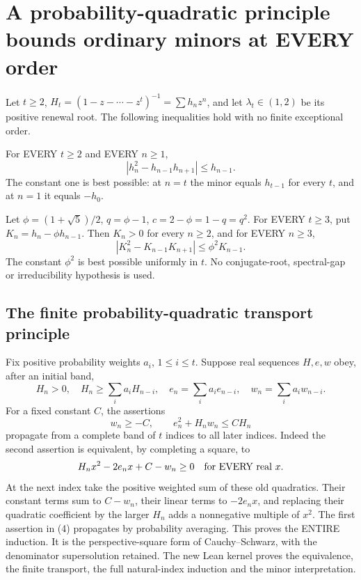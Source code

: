 \section{A probability-quadratic principle bounds ordinary minors at EVERY order}
Let $t\ge2$, $H_t=(1-z-\cdots-z^t)^{-1}=\sum h_nz^n$,
and let $\lambda_t\in(1,2)$ be its positive renewal root.
The following inequalities hold with no finite exceptional order.

\begin{theorem}
For EVERY $t\ge2$ and EVERY $n\ge1$,
\[
                  |h_n^2-h_{n-1}h_{n+1}|\le h_{n-1}.       \tag{1}
\]
The constant one is best possible: at $n=t$ the minor equals
$h_{t-1}$ for every $t$, and at $n=1$ it equals $-h_0$.
\end{theorem}

\begin{theorem}
Let $\phi=(1+\sqrt5)/2$, $q=\phi-1$, $c=2-\phi=1-q=q^2$.
For EVERY $t\ge3$, put $K_n=h_n-\phi h_{n-1}$.
Then $K_n>0$ for every $n\ge2$, and for EVERY $n\ge3$,
\[
             |K_n^2-K_{n-1}K_{n+1}|\le\phi^2K_{n-1}.       \tag{2}
\]
The constant $\phi^2$ is best possible uniformly in $t$.
No conjugate-root, spectral-gap or irreducibility hypothesis is used.
\end{theorem}

\subsection{The finite probability-quadratic transport principle}
Fix positive probability weights $a_i$, $1\le i\le t$.
Suppose real sequences $H,e,w$ obey, after an initial band,
\[
 H_n>0,\quad H_n\ge\sum_i a_iH_{n-i},\quad
 e_n=\sum_i a_ie_{n-i},\quad w_n=\sum_i a_iw_{n-i}.       \tag{3}
\]
For a fixed constant $C$, the assertions
\[
      w_n\ge-C,\qquad e_n^2+H_nw_n\le CH_n              \tag{4}
\]
propagate from a complete band of $t$ indices to all later indices.
Indeed the second assertion is equivalent, by completing a square, to
\[
                H_nx^2-2e_nx+C-w_n\ge0\quad\hbox{for EVERY real }x.
\]
At the next index take the positive weighted sum of these old
quadratics. Their constant terms sum to $C-w_n$, their linear
terms to $-2e_nx$, and replacing their quadratic coefficient by
the larger $H_n$ adds a nonnegative multiple of $x^2$.
The first assertion in (4) propagates by probability averaging.
This proves the ENTIRE induction. It is the perspective-square
form of Cauchy--Schwarz, with the denominator supersolution retained.
The new Lean kernel proves the equivalence, the finite transport,
the full natural-index induction and the minor interpretation.

